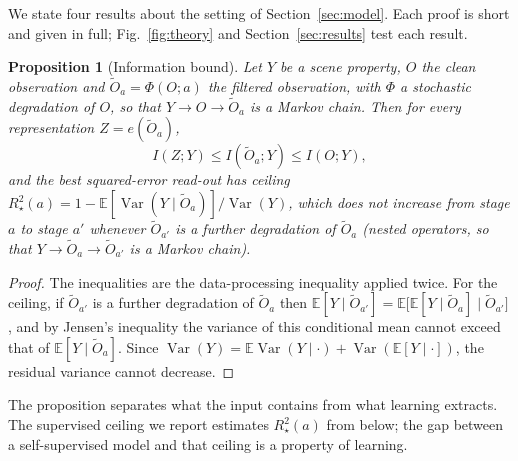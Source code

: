 \documentclass{article}
\theoremstyle{plain}
\newtheorem{proposition}{Proposition}
\theoremstyle{remark}
\begin{document}
We state four results about the setting of Section~\ref{sec:model}. Each proof is short and given in full; Fig.~\ref{fig:theory} and Section~\ref{sec:results} test each result.

\begin{proposition}[Information bound]\label{prop:info}
Let \(Y\) be a scene property, \(O\) the clean observation and \(\tilde O_a=\Phi(O;a)\) the filtered observation, with \(\Phi\) a stochastic degradation of \(O\), so that \(Y\to O\to\tilde O_a\) is a Markov chain. Then for every representation \(Z=e(\tilde O_a)\),
\begin{equation}I(Z;Y)\le I(\tilde O_a;Y)\le I(O;Y),\end{equation}
and the best squared-error read-out has ceiling \(R^2_\star(a)=1-\mathbb E[\operatorname{Var}(Y\mid\tilde O_a)]/\operatorname{Var}(Y)\), which does not increase from stage \(a\) to stage \(a'\) whenever \(\tilde O_{a'}\) is a further degradation of \(\tilde O_a\) (nested operators, so that \(Y\to\tilde O_a\to\tilde O_{a'}\) is a Markov chain).
\end{proposition}

\begin{proof}
The inequalities are the data-processing inequality applied twice. For the ceiling, if \(\tilde O_{a'}\) is a further degradation of \(\tilde O_a\) then \(\mathbb E[Y\mid\tilde O_{a'}]=\mathbb E\big[\mathbb E[Y\mid\tilde O_a]\mid\tilde O_{a'}\big]\), and by Jensen's inequality the variance of this conditional mean cannot exceed that of \(\mathbb E[Y\mid\tilde O_a]\). Since \(\operatorname{Var}(Y)=\mathbb E\operatorname{Var}(Y\mid\cdot)+\operatorname{Var}(\mathbb E[Y\mid\cdot])\), the residual variance cannot decrease.
\end{proof}

The proposition separates what the input contains from what learning extracts. The supervised ceiling we report estimates \(R^2_\star(a)\) from below; the gap between a self-supervised model and that ceiling is a property of learning.
\end{document}
